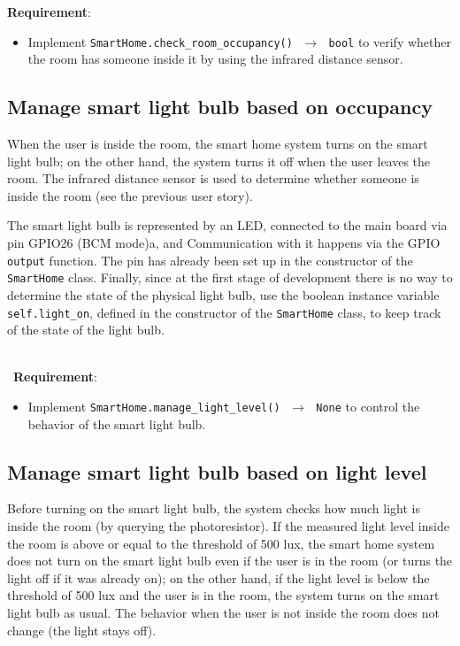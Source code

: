 \noindent\textbf{Requirement}:
\begin{itemize}
    \item Implement \texttt{SmartHome.check\_room\_occupancy() $\,\to\,$ bool} to verify whether the room has someone inside it by using the infrared distance sensor.
\end{itemize}


\subsection{Manage smart light bulb based on occupancy}
When the user is inside the room, the smart home system turns on the smart light bulb; on the other hand, the system turns it off when the user leaves the room. The infrared distance sensor is used to determine whether someone is inside the room (see the previous user story).

The smart light bulb is represented by an LED, connected to the main board via pin GPIO26 (BCM mode)a, and Communication with it happens via the GPIO \texttt{output} function. The pin has already been set up in the constructor of  the \texttt{SmartHome} class.
Finally, since at the first stage of development there is no way to determine the state of the physical light bulb, use the boolean instance variable \texttt{self.light\_on}, defined in the constructor of the \texttt{SmartHome} class, to keep track of the state of the light bulb.

\ \\ \
\noindent\textbf{Requirement}:
\begin{itemize}
    \item Implement \texttt{SmartHome.manage\_light\_level() $\,\to\,$ None} to control the behavior of the smart light bulb.
\end{itemize}


\subsection{Manage smart light bulb based on light level}
Before turning on the smart light bulb, the system checks how much light is inside the room (by querying the photoresistor). 
If the measured light level inside the room is above or equal to the threshold of 500 lux, the smart home system does not turn on the smart light bulb even if the user is in the room (or turns the light off if it was already on); on the other hand, if the light level is below the threshold of 500 lux and the user is in the room, the system turns on the smart light bulb as usual.
The behavior when the user is not inside the room does not change (\ie the light stays off).

